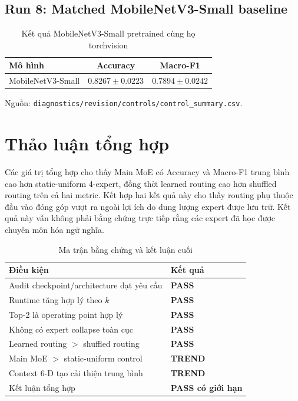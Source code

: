 \documentclass[conference]{IEEEtran}
\begin{document}
\subsection{Run 8: Matched MobileNetV3-Small baseline}

\begin{table}[H]
\caption{Kết quả MobileNetV3-Small pretrained cùng họ torchvision}
\label{tab:baseline}
\centering
\footnotesize
\begin{tabular}{@{}lcc@{}}
\toprule
Mô hình & Accuracy & Macro-F1 \\
\midrule
MobileNetV3-Small & $0.8267\pm0.0223$ & $0.7894\pm0.0242$ \\
\bottomrule
\end{tabular}
\vspace{2pt}

\raggedright\scriptsize Nguồn: \texttt{diagnostics/revision/controls/control\_summary.csv}.
\end{table}

\section{Thảo luận tổng hợp}

Các giá trị tổng hợp cho thấy Main MoE có Accuracy và Macro-F1 trung bình cao
hơn static-uniform 4-expert, đồng thời learned routing cao hơn shuffled
routing trên cả hai metric. Kết hợp hai kết quả này cho thấy routing phụ
thuộc đầu vào đóng góp vượt ra ngoài lợi ích do dung lượng expert được lưu
trữ. Kết quả này vẫn không phải bằng chứng trực tiếp rằng các expert đã học
được chuyên môn hóa ngữ nghĩa.

\begin{table}[H]
\caption{Ma trận bằng chứng và kết luận cuối}
\label{tab:evidence}
\centering
\footnotesize
\begin{tabular}{@{}p{}p{}@{}}
\toprule
Điều kiện & Kết quả \\
\midrule
Audit checkpoint/architecture đạt yêu cầu & \textbf{PASS} \\
Runtime tăng hợp lý theo $k$ & \textbf{PASS} \\
Top-2 là operating point hợp lý & \textbf{PASS} \\
Không có expert collapse toàn cục & \textbf{PASS} \\
Learned routing $>$ shuffled routing & \textbf{PASS} \\
Main MoE $>$ static-uniform control & \textbf{TREND} \\
Context 6-D tạo cải thiện trung bình & \textbf{TREND} \\
\midrule
Kết luận tổng hợp & \textbf{PASS có giới hạn} \\
\bottomrule
\end{tabular}
\end{table}
\end{document}
